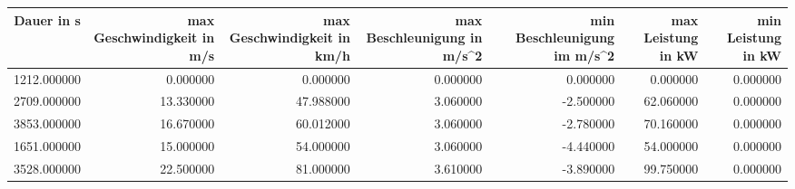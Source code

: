 \begin{tabular}{rrrrrrr}
\toprule
Dauer in s & max Geschwindigkeit in m/s & max Geschwindigkeit in km/h & max Beschleunigung in m/s^2 & min Beschleunigung im m/s^2 & max Leistung in kW & min Leistung in kW \\
\midrule
1212.000000 & 0.000000 & 0.000000 & 0.000000 & 0.000000 & 0.000000 & 0.000000 \\
2709.000000 & 13.330000 & 47.988000 & 3.060000 & -2.500000 & 62.060000 & 0.000000 \\
3853.000000 & 16.670000 & 60.012000 & 3.060000 & -2.780000 & 70.160000 & 0.000000 \\
1651.000000 & 15.000000 & 54.000000 & 3.060000 & -4.440000 & 54.000000 & 0.000000 \\
3528.000000 & 22.500000 & 81.000000 & 3.610000 & -3.890000 & 99.750000 & 0.000000 \\
\bottomrule
\end{tabular}
